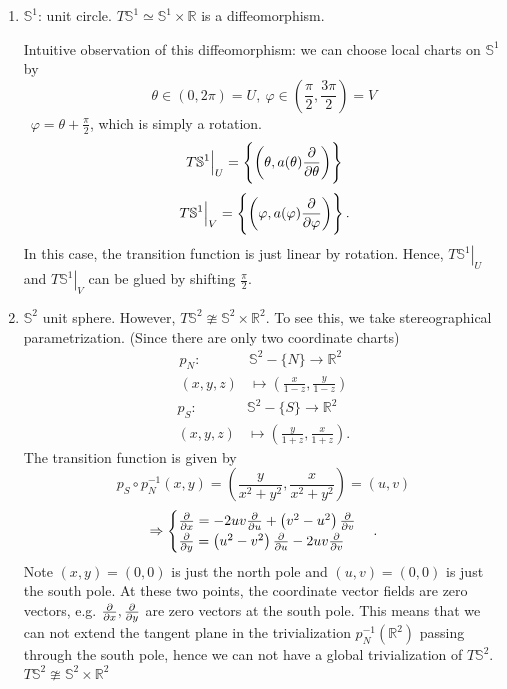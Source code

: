 \begin{exercise}
    \hfill
    \begin{enumerate}[(1)]
        \item \(\mathbb{S}^1\): unit circle. 
        \(T\mathbb{S}^1\simeq \mathbb{S}^1 \times \mathbb{R}\) 
        is a diffeomorphism.
        
        Intuitive observation of this diffeomorphism: we can
        choose local charts on \(\mathbb{S}^1\) by 
        \[\theta\in (0,2\pi)=U, ~\varphi \in 
        (\frac{\pi}{2},\frac{3\pi}{2})=V\]
        \ie\ \(\varphi=\theta+\frac{\pi}{2}\), which is simply
        a rotation. 
        \[\left.T\mathbb{S}^1\right|_U=\left\{
            \left(\theta,a(\theta)\pdv{\theta}\right)
        \right\}\]
        \[
            \left.T\mathbb{S}^1\right|_V=\left\{
            \left(\varphi,a(\varphi)\pdv{\varphi}\right)
            \right\}   
        .\]
        In this case, 
        the transition function is just linear by rotation.
        Hence, \(\left.T\mathbb{S}^1\right|_U\) and 
        \(\left.T\mathbb{S}^1\right|_V\) can be glued by shifting 
        \(\frac{\pi}{2}\).
        \item \(\mathbb{S}^2\) unit sphere.
        However, \(T\mathbb{S}^2\ncong \mathbb{S}^2\times 
        \mathbb{R}^2\).
        To see this, we take stereographical parametrization.
        (Since there are only two coordinate charts)
        \begin{align*}
            p_N\colon &\mathbb{S}^2-\{N\}\to \mathbb{R}^2\\
            (x,y,z)&\mapsto \left(\frac{x}{1-z},\frac{y}{1-z}\right)    
        \end{align*}
        \begin{align*}
            p_S\colon &\mathbb{S}^2-\{S\}\to \mathbb{R}^2\\
            (x,y,z)&\mapsto \left(\frac{y}{1+z},\frac{x}{1+z}\right)    
        .\end{align*}
        The transition function is given by 
        \[
          p_S\circ p_N^{-1}(x,y)=\left(\frac{y}{x^2+y^2},
          \frac{x}{x^2+y^2}\right)=(u,v)  
        \]
        \[
            \Rightarrow
            \begin{cases}
                \pdv{x}=-2uv\pdv{u}+\left(v^2-u^2\right)\pdv{v}\\
                \pdv y= \left(u^2-v^2\right)\pdv{u}
                -2uv\pdv{v}
            \end{cases}    
        .\]  
        Note \((x,y)=(0,0)\) is just the north pole and 
        \((u,v)=(0,0)\) is just the south pole. 
        At these two points, the coordinate vector fields 
        are zero vectors, e.g. \(\pdv{x},\pdv{y}\) are zero
        vectors at the south pole.
        This means that we can not extend the tangent 
        plane in the trivialization 
        \(p_N^{-1}\left(\mathbb{R}^2\right)\)
        passing through the south pole, hence we can not
        have a global trivialization of \(T\mathbb{S}^2\).
         \(T\mathbb{S}^2\ncong \mathbb{S}^2\times 
         \mathbb{R}^2\)
    \end{enumerate}         
\end{exercise}
